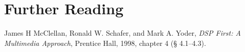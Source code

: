 \begin{enumerate}
\end{enumerate}

\section{Further Reading}

James H McClellan, Ronald W. Schafer, and Mark A. Yoder, \textit{DSP
  First: A Multimedia Approach}, Prentice Hall, 1998, chapter 4 (\S
4.1--4.3).

